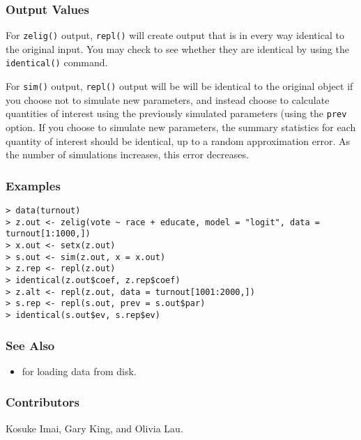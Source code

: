 \subsubsection{Output Values}
For {\tt zelig()} output, {\tt repl()} will create output that is in
every way identical to the original input.  You may check to see
whether they are identical by using the {\tt identical()} command.  

For {\tt sim()} output, {\tt repl()} output will be will be
identical to the original object if you choose not to simulate new
parameters, and instead choose to calculate quantities of interest
using the previously simulated parameters (using the {\tt prev}
option.  If you choose to simulate new parameters, the summary
statistics for each quantity of interest should be identical, up to a
random approximation error.  As the number of simulations increases,
this error decreases.

\subsubsection{Examples}
\begin{verbatim}
> data(turnout)
> z.out <- zelig(vote ~ race + educate, model = "logit", data = turnout[1:1000,])
> x.out <- setx(z.out)
> s.out <- sim(z.out, x = x.out)
> z.rep <- repl(z.out)
> identical(z.out$coef, z.rep$coef)
> z.alt <- repl(z.out, data = turnout[1001:2000,])
> s.rep <- repl(s.out, prev = s.out$par)
> identical(s.out$ev, s.rep$ev)
\end{verbatim} %

\subsubsection{See Also}
\begin{itemize}
  \item {} for loading data from disk.  
\end{itemize} 

\subsubsection{Contributors}

Kosuke Imai, Gary King, and Olivia Lau.  


